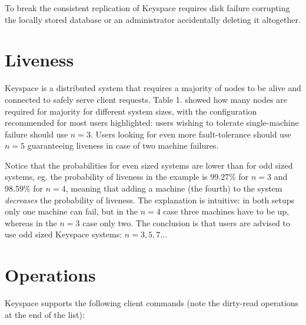 \documentclass[12pt]{article}
\begin{document}
To break the consistent replication of Keyspace requires disk failure corrupting the locally stored database or an administrator accidentally deleting it altogether.

\section{ Liveness }

Keyspace is a distributed system that requires a majority of nodes to be alive and connected to safely serve client requests. Table 1. showed how many nodes are required for majority for different system sizes, with the configuration recommended for most users highlighted: users wishing to tolerate single-machine failure should use $n=3$. Users looking for even more fault-tolerance should use $n=5$ guaranteeing liveness in case of two machine failures.

Notice that the probabilities for even sized systems are lower than for odd sized systems, eg. the probability of liveness in the example is 99.27\% for $n=3$ and 98.59\% for $n=4$, meaning that adding a machine (the fourth) to the system \textit{decreases} the probability of liveness. The explanation is intuitive: in both setups only one machine can fail, but in the $n=4$ case three machines have to be up, whereas in the $n=3$ case only two. The conclusion is that users are advised to use odd sized Keyspace systems: $n=3, 5, 7...$

\section{ Operations }

Keyspace supports the following client commands (note the dirty-read operations at the end of the list):
\end{document}
